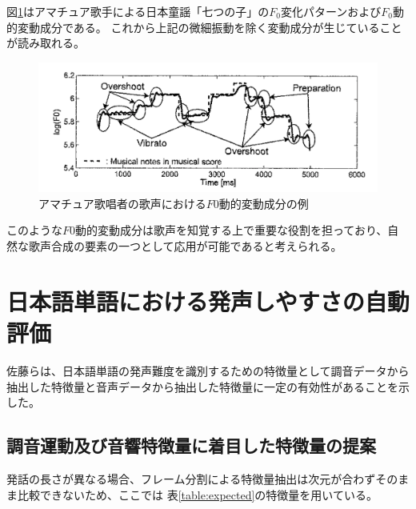 \documentclass[10.5ptj,a4j,dvipdfmx,uplatex, oneside, openany, report, draft]{jsbook}%
\begin{document}
図\ref{f0_moving}はアマチュア歌手による日本童謡「七つの子」の$F_0$変化パターンおよび$F_0$動的変動成分である。
これから上記の微細振動を除く変動成分が生じていることが読み取れる。

\begin{figure}[htbp]
    \begin{center}
      \includegraphics[clip,width=12.0cm]{f0_moving.png}
      \caption{アマチュア歌唱者の歌声における$F0$動的変動成分の例\cite{singbyspeaking}}
      \label{f0_moving}
    \end{center}
\end{figure}

このような$F0$動的変動成分は歌声を知覚する上で重要な役割を担っており、自然な歌声合成の要素の一つとして応用が可能であると考えられる。

\section{日本語単語における発声しやすさの自動評価}
佐藤らは、日本語単語の発声難度を識別するための特徴量として調音データから抽出した特徴量と音声データから抽出した特徴量に一定の有効性があることを示した\cite{sato}。

\subsection{調音運動及び音響特徴量に着目した特徴量の提案}
発話の長さが異なる場合、フレーム分割による特徴量抽出は次元が合わずそのまま比較できないため、ここでは
表\ref{table:expected}の特徴量を用いている。
\end{document}
